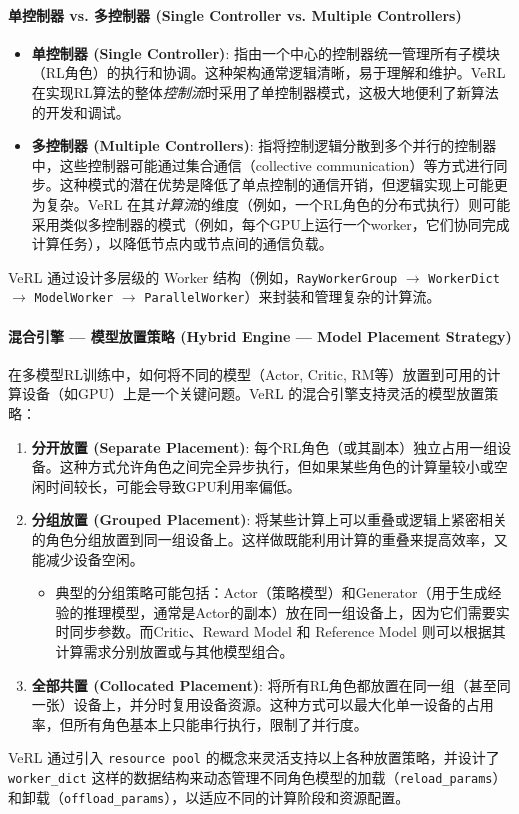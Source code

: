 \documentclass{article}
\begin{document}
\paragraph{单控制器 vs. 多控制器 (Single Controller vs. Multiple Controllers)}
\begin{itemize}
    \item \textbf{单控制器 (Single Controller)}: 指由一个中心的控制器统一管理所有子模块（RL角色）的执行和协调。这种架构通常逻辑清晰，易于理解和维护。VeRL 在实现RL算法的整体\emph{控制流}时采用了单控制器模式，这极大地便利了新算法的开发和调试。
    \item \textbf{多控制器 (Multiple Controllers)}: 指将控制逻辑分散到多个并行的控制器中，这些控制器可能通过集合通信（collective communication）等方式进行同步。这种模式的潜在优势是降低了单点控制的通信开销，但逻辑实现上可能更为复杂。VeRL 在其\emph{计算流}的维度（例如，一个RL角色的分布式执行）则可能采用类似多控制器的模式（例如，每个GPU上运行一个worker，它们协同完成计算任务），以降低节点内或节点间的通信负载。
\end{itemize}
VeRL 通过设计多层级的 Worker 结构（例如，\texttt{RayWorkerGroup} $\rightarrow$ \texttt{WorkerDict} $\rightarrow$ \texttt{ModelWorker} $\rightarrow$ \texttt{ParallelWorker}）来封装和管理复杂的计算流。

\paragraph{混合引擎 — 模型放置策略 (Hybrid Engine — Model Placement Strategy)}
在多模型RL训练中，如何将不同的模型（Actor, Critic, RM等）放置到可用的计算设备（如GPU）上是一个关键问题。VeRL 的混合引擎支持灵活的模型放置策略：
\begin{enumerate}
    \item \textbf{分开放置 (Separate Placement)}: 每个RL角色（或其副本）独立占用一组设备。这种方式允许角色之间完全异步执行，但如果某些角色的计算量较小或空闲时间较长，可能会导致GPU利用率偏低。
    \item \textbf{分组放置 (Grouped Placement)}: 将某些计算上可以重叠或逻辑上紧密相关的角色分组放置到同一组设备上。这样做既能利用计算的重叠来提高效率，又能减少设备空闲。
    \begin{itemize}
        \item 典型的分组策略可能包括：Actor（策略模型）和Generator（用于生成经验的推理模型，通常是Actor的副本）放在同一组设备上，因为它们需要实时同步参数。而Critic、Reward Model 和 Reference Model 则可以根据其计算需求分别放置或与其他模型组合。
    \end{itemize}
    \item \textbf{全部共置 (Collocated Placement)}: 将所有RL角色都放置在同一组（甚至同一张）设备上，并分时复用设备资源。这种方式可以最大化单一设备的占用率，但所有角色基本上只能串行执行，限制了并行度。
\end{enumerate}
VeRL 通过引入 \texttt{resource pool} 的概念来灵活支持以上各种放置策略，并设计了 \texttt{worker\_dict} 这样的数据结构来动态管理不同角色模型的加载（\texttt{reload\_params}）和卸载（\texttt{offload\_params}），以适应不同的计算阶段和资源配置。
\end{document}
